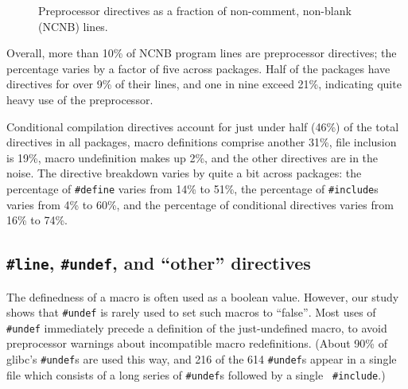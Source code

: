 \documentclass[11pt]{article}
\newcommand{\pkg}[1]{\textsf{#1}}
\begin{document}

\begin{figure}
\centerline{}
\caption{Preprocessor directives as a fraction of non-comment,
  non-blank (NCNB) lines.}
\label{fig:directives-breakdown}
\end{figure}

Overall, more than 10\% of NCNB program lines are preprocessor directives;
the percentage varies by a factor of five across packages.  Half of
the packages
have directives for over 9\% of their lines, and one in nine exceed 21\%,
indicating quite heavy use of the preprocessor.



Conditional compilation directives account for just under half (46\%) of
the total directives in all packages, macro definitions comprise another
31\%, file inclusion is 19\%, macro undefinition makes up 2\%, and the
other directives are in the noise.  The directive breakdown varies by quite
a bit across packages: the percentage of {\tt \#define} varies from 14\% to
51\%, the percentage of {\tt \#include}s varies from 4\% to 60\%, and the
percentage of conditional directives varies from 16\% to 74\%.



\subsection{{\tt \#line}, {\tt \#undef}, and ``other'' directives}

The definedness of a macro is often used as a boolean value.  However, our
study shows that {\tt \#undef} is rarely used to set such macros to
``false''$\!$.  Most uses of {\tt \#undef} immediately precede a definition of
the just-undefined macro, to avoid preprocessor warnings about incompatible
macro redefinitions.  (About 90\% of \pkg{glibc}'s {\tt \#undef}s are used this
way, and 216 of the 614 {\tt \#undef}s appear in a single file which
consists of a long series of {\tt \#undef}s followed by a single {\tt
\#include}.)
\end{document}
